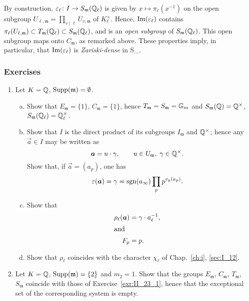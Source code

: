 \begin{obs}
By construction, $\varepsilon_\ell\colon I \to S_{\mathfrak{m}}(\Q_\ell)$ is
given by $x \mapsto \pi_\ell(x^{-1})$ on the open subgroup $U_{\ell,
\mathfrak{m}} = \prod_{v\mid\ell} U_{v, \mathfrak{m}}$ of $K_\ell^\times$.
Hence, $\Img(\varepsilon_\ell)$ contains $\pi_\ell(U_{\ell, \mathfrak{m}})
\subset T_{\mathfrak{m}}(\Q_\ell) \subset S_{\mathfrak{m}}(\Q_\ell)$, and is an
\emph{open subgroup} of $S_{\mathfrak{m}}(\Q_\ell)$. This open subgroup maps
onto $C_{\mathfrak{m}}$, as remarked above. These properties imply, in
particular, that $\Img(\varepsilon_\ell)$ is \emph{Zariski-dense} in
S_{}.
\end{obs}

\subsubsection*{Exercises}
\dpage
\begin{enumerate}[label=(\arabic*), ref=\arabic*]
\item\label{exr:II_23_1}
	Let $K = \Q$, $\Supp(\mathfrak{m}) = \emptyset$.
\begin{enumerate}[a)]
\item Show that $E_{\mathfrak{m}} = \{ 1 \}$, $C_{\mathfrak{m}} = \{ 1 \}$,
	hence $T_{\mathfrak{m}} = S_{\mathfrak{m}} = \GG_m$ and
	$S_{\mathfrak{m}}(\Q) = \Q^\times$, $S_{\mathfrak{m}}(\Q_\ell) =
	\Q_\ell^\times$.
\item Show that $I$ is the direct product of its subgroups $I_{\mathfrak{m}}$
	and $\Q^\times$; hence any $\vec a \in I$ may be written as
	\[
		\vec a = u\cdot \gamma, \qquad u \in U_{\mathfrak{m}},
		\; \gamma \in \Q^\times.
	\]
	Show that, if $\vec a = (a_p)$, one has
	\[
		\varepsilon(\vec a) = \gamma = \sgn(a_\infty) \prod_{p}
		p^{v_p(a_p)}.
	\]
\item Show that
	\begin{align*}
		\rho_\ell(\vec a) &= \gamma \cdot a_\ell^{-1}, \\
		\intertext{and}
		F_p &= p.
	\end{align*}
\item Show that $\rho_\ell$ coincides with the character $\chi_\ell$ of
	Chap.~\ref{ch:i}, \ref{sec:I_12}.
\end{enumerate}
\item\label{exr:II_23_2}
	Let $K = \Q$, $\Supp(\mathfrak{m}) = \{ 2 \}$ and $m_2 = 1$. Show that
	the groups $E_{\mathfrak{m}}$, $C_{\mathfrak{m}}$, $T_{\mathfrak{m}}$,
	$S_{\mathfrak{m}}$ coincide with those of Exercise~\ref{exr:II_23_1},
	hence that the exceptional set of the corresponding system is empty.
\end{enumerate}

